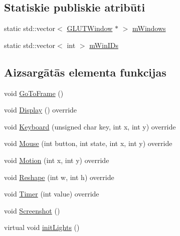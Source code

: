 \subsection*{Statiskie publiskie atribūti}
\begin{DoxyCompactItemize}
\item 
static std\+::vector$<$ \hyperlink{class_v_p_c_1_1_g_u_i_1_1_g_l_u_t_window}{G\+L\+U\+T\+Window} $\ast$ $>$ \hyperlink{class_v_p_c_1_1_g_u_i_1_1_g_l_u_t_window_aad2948c3a88afb3bc03f9bc54a81f285}{m\+Windows}
\item 
static std\+::vector$<$ int $>$ \hyperlink{class_v_p_c_1_1_g_u_i_1_1_g_l_u_t_window_a1ceb7745b98f3497579a0f4e8288419e}{m\+Win\+I\+Ds}
\end{DoxyCompactItemize}
\subsection*{Aizsargātās elementa funkcijas}
\begin{DoxyCompactItemize}
\item 
void \hyperlink{class_v_p_c_1_1_g_u_i_1_1_sim_window_a3e7a520e02dde6a2e8525f86db0c7895}{Go\+To\+Frame} ()
\item 
void \hyperlink{class_v_p_c_1_1_g_u_i_1_1_sim_window_a6863fa1bec1696c6984c2f1066428e21}{Display} () override
\item 
void \hyperlink{class_v_p_c_1_1_g_u_i_1_1_sim_window_a6da00ed4fb5f11befaf1dba6485cfcfb}{Keyboard} (unsigned char key, int x, int y) override
\item 
void \hyperlink{class_v_p_c_1_1_g_u_i_1_1_sim_window_a6decd7c869caee8f54c8c80d46b6d4e6}{Mouse} (int button, int state, int x, int y) override
\item 
void \hyperlink{class_v_p_c_1_1_g_u_i_1_1_sim_window_aba3a57913fd25280353abe94a64539fc}{Motion} (int x, int y) override
\item 
void \hyperlink{class_v_p_c_1_1_g_u_i_1_1_sim_window_a53692e6568f1568679f3f8a7793f1f15}{Reshape} (int w, int h) override
\item 
void \hyperlink{class_v_p_c_1_1_g_u_i_1_1_sim_window_ab45783776b702b9e7fb6de00a57a88e7}{Timer} (int value) override
\item 
void \hyperlink{class_v_p_c_1_1_g_u_i_1_1_sim_window_ac609ccaf459a941709927da1e36403e8}{Screenshot} ()
\item 
virtual void \hyperlink{class_v_p_c_1_1_g_u_i_1_1_g_l_u_t_window_a216d92bb142c672c42a69e5fd9163746}{init\+Lights} ()
\end{DoxyCompactItemize}
